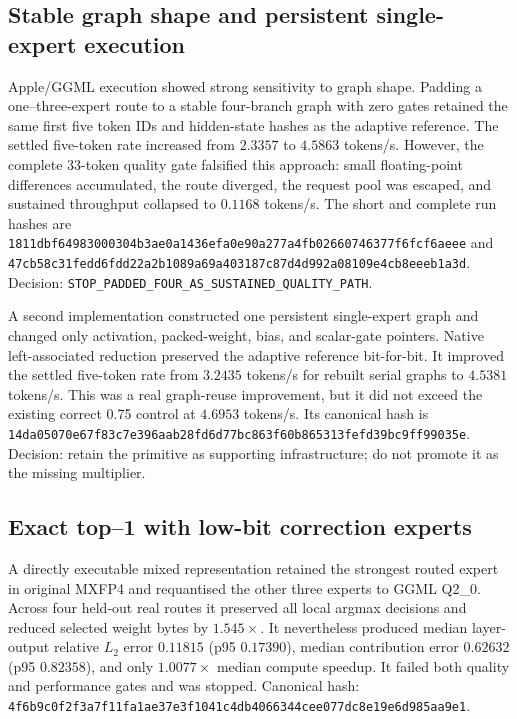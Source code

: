 \subsection{Stable graph shape and persistent single-expert execution}

Apple/GGML execution showed strong sensitivity to graph shape.  Padding a
one--three-expert route to a stable four-branch graph with zero gates retained
the same first five token IDs and hidden-state hashes as the adaptive reference.
The settled five-token rate increased from $2.3357$ to $4.5863$ tokens/s.
However, the complete 33-token quality gate falsified this approach: small
floating-point differences accumulated, the route diverged, the request pool
was escaped, and sustained throughput collapsed to $0.1168$ tokens/s.  The
short and complete run hashes are
\texttt{1811dbf64983000304b3ae0a1436efa0e90a277a4fb02660746377f6fcf6aeee}
and
\texttt{47cb58c31fedd6fdd22a2b1089a69a403187c87d4d992a08109e4cb8eeeb1a3d}.
Decision: \texttt{STOP\_PADDED\_FOUR\_AS\_SUSTAINED\_QUALITY\_PATH}.

A second implementation constructed one persistent single-expert graph and
changed only activation, packed-weight, bias, and scalar-gate pointers.  Native
left-associated reduction preserved the adaptive reference bit-for-bit.  It
improved the settled five-token rate from $3.2435$ tokens/s for rebuilt serial
graphs to $4.5381$ tokens/s.  This was a real graph-reuse improvement, but it did
not exceed the existing correct 0.75 control at $4.6953$ tokens/s.  Its canonical
hash is
\texttt{14da05070e67f83c7e396aab28fd6d77bc863f60b865313fefd39bc9ff99035e}.
Decision: retain the primitive as supporting infrastructure; do not promote it
as the missing multiplier.

\subsection{Exact top--1 with low-bit correction experts}

A directly executable mixed representation retained the strongest routed
expert in original MXFP4 and requantised the other three experts to GGML Q2\_0.
Across four held-out real routes it preserved all local argmax decisions and
reduced selected weight bytes by $1.545\times$.  It nevertheless produced
median layer-output relative $L_2$ error $0.11815$ (p95 $0.17390$), median
contribution error $0.62632$ (p95 $0.82358$), and only $1.0077\times$ median
compute speedup.  It failed both quality and performance gates and was stopped.
Canonical hash:
\texttt{4f6b9c0f2f3a7f11fa1ae37e3f1041c4db4066344cee077dc8e19e6d985aa9e1}.

